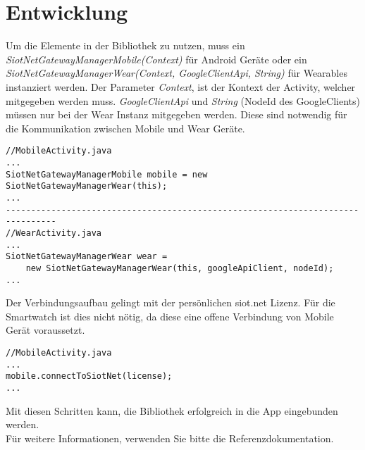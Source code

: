 \section{Entwicklung}
Um die Elemente in der Bibliothek zu nutzen, muss ein \textit{SiotNetGatewayManagerMobile(Context)} für Android Geräte oder ein \textit{SiotNetGatewayManagerWear(Context, GoogleClientApi, String)} für Wearables instanziert werden. Der Parameter \textit{Context}, ist der Kontext der Activity, welcher mitgegeben werden muss. \textit{GoogleClientApi} und \textit{String} (NodeId des GoogleClients) müssen nur bei der Wear Instanz mitgegeben werden. Diese sind notwendig für die Kommunikation zwischen Mobile und Wear Geräte.
\begin{lstlisting}
//MobileActivity.java
...
SiotNetGatewayManagerMobile mobile = new SiotNetGatewayManagerWear(this);
...
--------------------------------------------------------------------------------
//WearActivity.java
...
SiotNetGatewayManagerWear wear =
    new SiotNetGatewayManagerWear(this, googleApiClient, nodeId);
...
\end{lstlisting}
Der Verbindungsaufbau gelingt mit der persönlichen siot.net Lizenz. Für die Smartwatch ist dies nicht nötig, da diese eine offene Verbindung von Mobile Gerät voraussetzt.
\begin{lstlisting}
//MobileActivity.java
...
mobile.connectToSiotNet(license);
...
\end{lstlisting}
Mit diesen Schritten kann, die Bibliothek erfolgreich in die App eingebunden werden.\\
Für weitere Informationen, verwenden Sie bitte die Referenzdokumentation.
